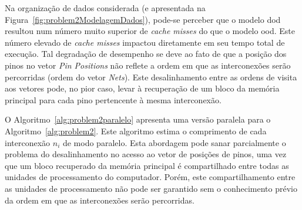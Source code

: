 

Na organização de dados considerada (e apresentada na Figura~\ref{fig:problem2ModelagemDados}), pode-se perceber que o modelo \ac{dod} resultou num número muito superior de  \textit{cache misses} do que o modelo \ac{ood}. Este número elevado de  \textit{cache misses} impactou diretamente em seu tempo total de execução.
Tal degradação de desempenho se deve ao fato de que a posição dos pinos no vetor \textit{Pin Positions} não reflete a ordem em que as interconexões serão percorridas (ordem do vetor \textit{Nets}). 
Este desalinhamento entre as ordens de visita aos vetores pode, no pior caso, levar à recuperação de um bloco da memória principal para cada pino pertencente à mesma interconexão.


O Algoritmo~\ref{alg:problem2paralelo} apresenta uma versão paralela para o Algoritmo~\ref{alg:problem2}.
Este algoritmo estima o comprimento de cada interconexão $n_i$ de modo paralelo. 
Esta abordagem pode sanar parcialmente o problema do desalinhamento no acesso ao vetor de posições de pinos, uma vez que um bloco recuperado da memória principal é compartilhado entre todas as unidades de processamento do computador.
Porém, este compartilhamento entre as unidades de processamento não pode ser garantido sem o conhecimento prévio da ordem em que as interconexões serão percorridas.

